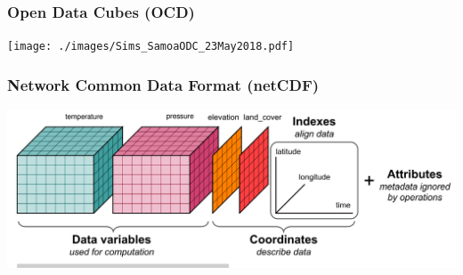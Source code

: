 
% 


\begin{frame}

\frametitle{Open Data Cubes (OCD)}
\vspace{-1cm}
 \texttt{[image: ./images/Sims\_SamoaODC\_23May2018.pdf]}

\end{frame}

\begin{frame}

\frametitle{Network Common Data Format (netCDF) }

 \includegraphics[width=1.1\textwidth]{./images/netCDF_schema.png}

\end{frame}



